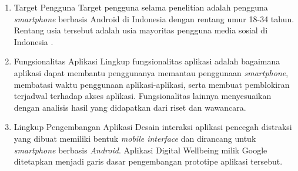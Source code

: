 \begin{enumerate}
  \item Target Pengguna
  \subitem Target pengguna selama penelitian adalah pengguna \textit{smartphone} berbasis Android di Indonesia dengan rentang umur 18-34 tahun. Rentang usia tersebut adalah usia mayoritas pengguna media sosial di Indonesia \parencite{mediasosial2020}.
  
  \item Fungsionalitas Aplikasi
  \subitem Lingkup fungsionalitas aplikasi adalah bagaimana aplikasi dapat membantu penggunanya memantau penggunaan \textit{smartphone}, membatasi waktu penggunaan aplikasi-aplikasi, serta membuat pemblokiran terjadwal terhadap akses aplikasi. Fungsionalitas lainnya menyesuaikan dengan analisis hasil yang didapatkan dari riset dan wawancara. 
   
  \item Lingkup Pengembangan Aplikasi
  \subitem Desain interaksi aplikasi pencegah distraksi yang dibuat memiliki bentuk \textit{mobile interface} dan dirancang untuk \textit{smartphone} berbasis \textit{Android}. Aplikasi Digital Wellbeing milik Google ditetapkan menjadi garis dasar pengembangan prototipe aplikasi tersebut.

\end{enumerate}





\newpage

